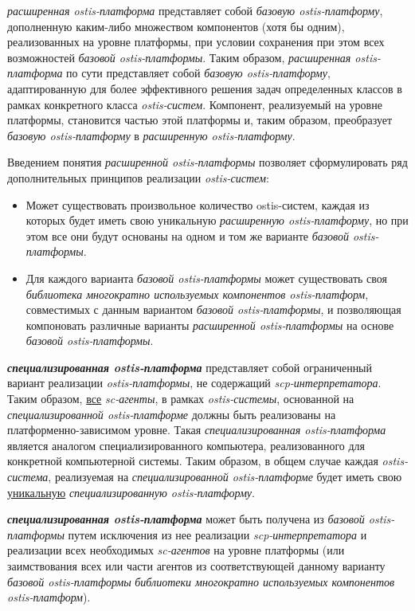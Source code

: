 \textit{расширенная ostis-платформа} представляет собой \textit{базовую ostis-платформу}, дополненную каким-либо множеством компонентов (хотя бы одним), реализованных на уровне платформы, при условии сохранения при этом всех возможностей \textit{базовой ostis-платформы}. Таким образом, \textit{расширенная ostis-платформа} по сути представляет собой \textit{базовую ostis-платформу}, адаптированную для более эффективного решения задач определенных классов в рамках конкретного класса \textit{ostis-систем}. Компонент, реализуемый на уровне платформы, становится частью этой платформы и, таким образом,  преобразует \textit{базовую ostis-платформу} в \textit{расширенную ostis-платформу}. 

Введением понятия \textit{расширенной ostis-платформы} позволяет сформулировать ряд дополнительных принципов реализации \textit{ostis-систем}:
\begin{itemize}
	\item Может существовать произвольное количество ostis-систем, каждая из которых будет иметь свою уникальную \textit{расширенную ostis-платформу}, но при этом все они будут основаны на одном и том же варианте \textit{базовой ostis-платформы}.
	\item Для каждого варианта \textit{базовой ostis-платформы} может существовать своя \textit{библиотека многократно используемых компонентов ostis-платформ}, совместимых с данным вариантом \textit{базовой ostis-платформы}, и позволяющая компоновать различные варианты \textit{расширенной ostis-платформы} на основе \textit{базовой ostis-платформы}.
\end{itemize} 

\textbf{\textit{специализированная ostis-платформа}} представляет собой ограниченный вариант реализации \textit{ostis-платформы}, не содержащий \textit{scp-интерпретатора}. Таким образом, \uline{все} \textit{sc-агенты}, в рамках \textit{ostis-системы}, основанной на \textit{специализированной ostis-платформе} должны быть реализованы на платформенно-зависимом уровне. Такая  \textit{специализированная ostis-платформа} является аналогом специализированного компьютера, реализованного для конкретной компьютерной системы. Таким образом, в общем случае каждая \textit{ostis-система}, реализуемая на \textit{специализированной ostis-платформе} будет иметь свою \uline{уникальную} \textit{специализированную ostis-платформу}.

\textbf{\textit{специализированная ostis-платформа}} может быть получена из \textit{базовой ostis-платформы} путем исключения из нее реализации  \textit{scp-интерпретатора} и реализации всех необходимых \textit{sc-агентов} на уровне платформы (или заимствования всех или части агентов из соответствующей данному варианту \textit{базовой ostis-платформы} \textit{библиотеки многократно используемых компонентов ostis-платформ}).

